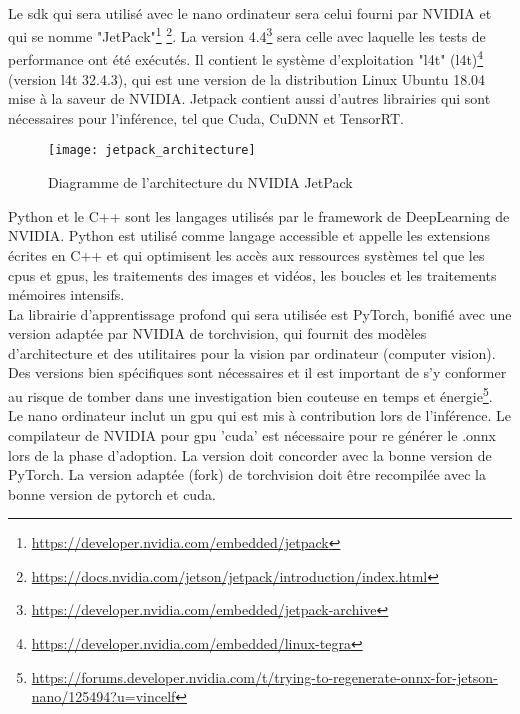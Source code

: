 \\
\noindent Le \acrshort{sdk} qui sera utilisé avec le nano ordinateur sera celui fourni par NVIDIA et qui se nomme "JetPack"\footnote{\url{https://developer.nvidia.com/embedded/jetpack}} \footnote{\url{https://docs.nvidia.com/jetson/jetpack/introduction/index.html}}. La version 4.4\footnote{\url{https://developer.nvidia.com/embedded/jetpack-archive}} sera celle avec laquelle les tests de performance ont été exécutés. Il contient le système d'exploitation "\acrlong{l4t}" (\acrshort{l4t})\footnote{\url{https://developer.nvidia.com/embedded/linux-tegra}} (version \acrshort{l4t} 32.4.3), qui est une version de la distribution Linux Ubuntu 18.04 mise à la saveur de NVIDIA. Jetpack contient aussi d'autres librairies qui sont nécessaires pour l'inférence, tel que Cuda, CuDNN et TensorRT.
\begin{figure}[H]
    \centering
    \texttt{[image: jetpack\_architecture]}
    \caption[Diagramme de l'architecture du NVIDIA JetPack]{Diagramme de l'architecture du NVIDIA JetPack\protect\footnotemark}
    \label{fig:jetpack_architecture}
\end{figure}
\vspace{\baselineskip}
\noindent Python et le C++ sont les langages utilisés par le framework de DeepLearning de NVIDIA. Python est utilisé comme langage accessible et appelle les extensions écrites en C++ et qui optimisent les accès aux ressources systèmes tel que les \acrshort{cpu}s et \acrshort{gpu}s, les traitements des images et vidéos, les boucles et les traitements mémoires intensifs.
\vspace{\baselineskip}
\\
\noindent La librairie d’apprentissage profond qui sera utilisée est PyTorch, bonifié avec une version adaptée par NVIDIA de torchvision, qui fournit des modèles d'architecture et des utilitaires pour la vision par ordinateur (computer vision). Des versions bien spécifiques sont nécessaires et il est important de s'y conformer au risque de tomber dans une investigation bien couteuse en temps et énergie\footnote{\url{https://forums.developer.nvidia.com/t/trying-to-regenerate-onnx-for-jetson-nano/125494?u=vincelf}}.
\vspace{\baselineskip}
\\
\noindent Le nano ordinateur inclut un \acrshort{gpu} qui est mis à contribution lors de l'inférence. Le compilateur de NVIDIA pour \acrshort{gpu} 'cuda' est nécessaire pour re générer le .onnx lors de la phase d'adoption. La version doit concorder avec la bonne version de PyTorch. La version adaptée (fork) de torchvision doit être recompilée avec la bonne version de pytorch et cuda. 
